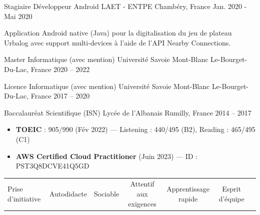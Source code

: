 \documentclass[11pt, a4paper]{awesome-cv}
\begin{document}
\begin{cventries}
  \cventry
    {Stagiaire Développeur Android}
    {LAET - ENTPE}
    {Chambéry, France}
    {Jan. 2020 - Mai 2020}
    {
      \vspace{2.0mm}
      \begin{cvitems}
        \item {Application Android native (Java) pour la digitalisation du jeu de plateau Urbalog avec support multi-devices à l'aide de l'API Nearby Connections.}
      \end{cvitems}
    }

\end{cventries}


\begin{cventries}
  \cventry
    {Master Informatique (avec mention)}
    {Université Savoie Mont-Blanc}
    {Le-Bourget-Du-Lac, France}
    {2020 -- 2022}
    {}

  \cventry
    {Licence Informatique (avec mention)}
    {Université Savoie Mont-Blanc}
    {Le-Bourget-Du-Lac, France}
    {2017 -- 2020}
    {}

  \cventry
    {Baccalauréat Scientifique (ISN)}
    {Lycée de l'Albanais}
    {Rumilly, France}
    {2014 -- 2017}
    {}

\end{cventries}


\begin{itemize}
  \item {\textbf{TOEIC} : 905/990 (Fév 2022) — Listening : 440/495 (B2), Reading : 465/495 (C1)}
  \item {\textbf{AWS Certified Cloud Practitioner} (Juin 2023) — ID : PST3Q8DCVE41Q5GD}
\end{itemize}


\begin{tabular*}{\textwidth}{@{\extracolsep{\fill}}lcccccc}
Prise d'initiative & Autodidacte & Sociable & Attentif aux exigences & Apprentissage rapide & Esprit d'équipe \\
\end{tabular*}
\end{document}
